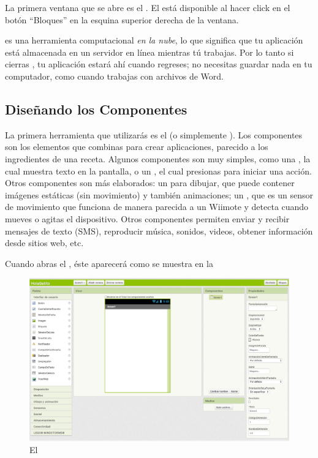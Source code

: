 \documentclass[letterpaper]{article}
\begin{document}
La primera ventana que se abre es el \componentDesigner. El \blockEditor está
disponible al hacer click en el botón ``Bloques'' en la esquina
superior derecha de la ventana.

\AppInventor es una herramienta computacional \emph{en la nube}, lo
que significa que tu aplicación está almacenada en un servidor en
línea mientras tú trabajas. Por lo tanto si cierras \AppInventor, tu
aplicación estará ahí cuando regreses; no necesitas guardar nada en tu
computador, como cuando trabajas con archivos de Word.

\subsection*{Diseñando los Componentes}

La primera herramienta que utilizarás es el \componentDesigner (o
simplemente \designer). Los componentes son los elementos que combinas
para crear aplicaciones, parecido a los ingredientes de una
receta. Algunos componentes son muy simples, como una
, la cual muestra texto en la pantalla, o un
, el cual presionas para iniciar una acción. Otros
componentes son más elaborados: un  para dibujar,
que puede contener imágenes estáticas (sin movimiento) y también
animaciones; un , que es un sensor de
movimiento que funciona de manera parecida a un Wiimote y detecta
cuando mueves o agitas el dispositivo. Otros componentes permiten
enviar y recibir mensajes de texto (SMS), reproducir música, sonidos,
videos, obtener información desde sitios web, etc.

Cuando abras el \designer, éste aparecerá como se muestra en
la~

\begin{figure}[H]
\centering
\includegraphics[scale=0.25]{figures/emptyDesigner}
\caption{El \componentDesigner}
\label{fig:emptyDesigner}
\end{figure}
\end{document}
